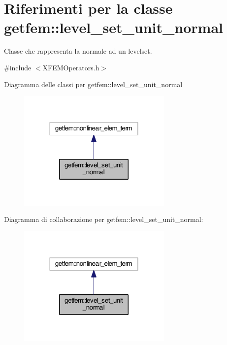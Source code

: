 \hypertarget{classgetfem_1_1level__set__unit__normal}{\section{Riferimenti per la classe getfem\-:\-:level\-\_\-set\-\_\-unit\-\_\-normal}
\label{classgetfem_1_1level__set__unit__normal}
}


Classe che rappresenta la normale ad un levelset.  




{\ttfamily \#include $<$X\-F\-E\-M\-Operators.\-h$>$}



Diagramma delle classi per getfem\-:\-:level\-\_\-set\-\_\-unit\-\_\-normal\nopagebreak
\begin{figure}[H]
\begin{center}
\leavevmode
\includegraphics[width=214pt]{classgetfem_1_1level__set__unit__normal__inherit__graph}
\end{center}
\end{figure}


Diagramma di collaborazione per getfem\-:\-:level\-\_\-set\-\_\-unit\-\_\-normal\-:\nopagebreak
\begin{figure}[H]
\begin{center}
\leavevmode
\includegraphics[width=214pt]{classgetfem_1_1level__set__unit__normal__coll__graph}
\end{center}
\end{figure}

